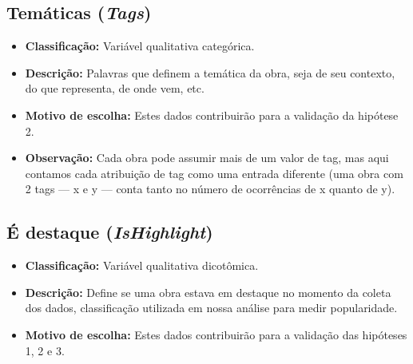 \documentclass[11pt,a4paper]{article}
\begin{document}
\subsection*{Temáticas (\textit{Tags})}
\begin{itemize}
    \item \textbf{Classificação:} Variável qualitativa categórica.
    \item \textbf{Descrição:} Palavras que definem a temática da obra, seja de seu contexto, do que representa, de onde vem, etc.
    \item \textbf{Motivo de escolha:} Estes dados contribuirão para a validação da hipótese 2.
    \item \textbf{Observação:} Cada obra pode assumir mais de um valor de tag, mas aqui contamos cada atribuição de tag como uma entrada diferente (uma obra com 2 tags --- x e y --- conta tanto no número de ocorrências de x quanto de y).
\end{itemize}

\subsection*{É destaque (\textit{IsHighlight})}
\begin{itemize}
    \item \textbf{Classificação:} Variável qualitativa dicotômica.
    \item \textbf{Descrição:} Define se uma obra estava em destaque no momento da coleta dos dados, classificação utilizada em nossa análise para medir popularidade.
    \item \textbf{Motivo de escolha:} Estes dados contribuirão para a validação das hipóteses 1, 2 e 3.
\end{itemize}
\end{document}
